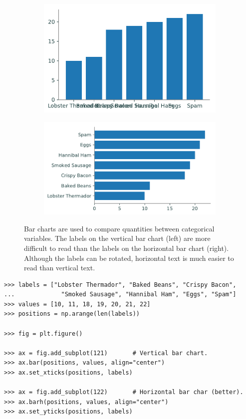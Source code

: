 \begin{figure}[H] %
    \centering
    \begin{subfigure}{.47\textwidth}
        \centering
        \includegraphics[width=\textwidth]{figures/bar_1.pdf}
    \end{subfigure}
    \begin{subfigure}{.52\textwidth}
        \centering
        \includegraphics[width=\textwidth]{figures/bar_2.pdf}
    \end{subfigure}
    \caption{Bar charts are used to compare quantities between categorical variables. The labels on the vertical bar chart (left) are more difficult to read than the  labels on the horizontal bar chart (right). Although the labels can be rotated, horizontal text is much easier to read than vertical text.}
\end{figure}

\begin{lstlisting}
>>> labels = ["Lobster Thermador", "Baked Beans", "Crispy Bacon",
...             "Smoked Sausage", "Hannibal Ham", "Eggs", "Spam"]
>>> values = [10, 11, 18, 19, 20, 21, 22]
>>> positions = np.arange(len(labels))

>>> fig = plt.figure()

>>> ax = fig.add_subplot(121)       # Vertical bar chart.
>>> ax.bar(positions, values, align="center")
>>> ax.set_xticks(positions, labels)

>>> ax = fig.add_subplot(122)       # Horizontal bar char (better).
>>> ax.barh(positions, values, align="center")
>>> ax.set_yticks(positions, labels)
\end{lstlisting}

